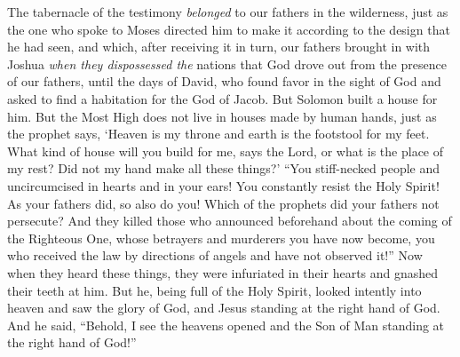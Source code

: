 \begin{biblechapter}
\verse The tabernacle of the testimony \textit{belonged} to our fathers in the wilderness, just as the one who spoke to Moses directed him to make it according to the design that he had seen,
\verse and which, after receiving it in turn, our fathers brought in with Joshua \textit{when they dispossessed the} nations that God drove out from the presence of our fathers, until the days of David,
\verse who found favor in the sight of God and asked to find a habitation for the God of Jacob.
\verse But Solomon built a house for him.
\verse But the Most High does not live in houses made by human hands, just as the prophet says,
\verse ‘Heaven is my throne 
and earth is the footstool for my feet. 
What kind of house will you build for me, says the Lord, 
or what is the place of my rest?
\verse Did not my hand make all these things?’
\verse “You stiff-necked people and uncircumcised in hearts and in your ears! You constantly resist the Holy Spirit! As your fathers did, so also do you!
\verse Which of the prophets did your fathers not persecute? And they killed those who announced beforehand about the coming of the Righteous One, whose betrayers and murderers you have now become,
\verse you who received the law by directions of angels and have not observed it!”
 Now when they heard these things, they were infuriated in their hearts and gnashed their teeth at him.
\verse But he, being full of the Holy Spirit, looked intently into heaven and saw the glory of God, and Jesus standing at the right hand of God.
\verse And he said, “Behold, I see the heavens opened and the Son of Man standing at the right hand of God!”

\end{biblechapter}

